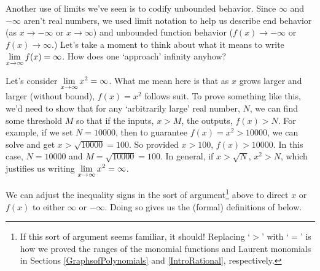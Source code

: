 \documentclass{ximera}
\begin{document}
Another use of limits we've seen is to codify unbounded behavior.  Since $\infty$ and $-\infty$ aren't real numbers,  we used limit notation to help us describe end behavior  (as $x \rightarrow - \infty$ or $x \rightarrow \infty$) and unbounded function behavior ($f(x)\rightarrow -\infty$ or $f(x) \rightarrow \infty$.)  Let's take a moment to think about what it means to write $\ds{\lim_{x \rightarrow \infty} f(x) = \infty}$.  How does one `approach' infinity anyhow?  

\medskip

Let's consider  $\ds{\lim_{x \rightarrow \infty} x^2 = \infty}$.  What me mean here is that as $x$ grows larger and larger (without bound), $f(x) = x^2$ follows suit.  To prove something like this, we'd need to show that for any `arbitrarily large' real number, $N$, we can find some threshold $M$ so that if the inputs, $x>M$, the outputs, $f(x) > N$.  For example, if we set $N = 10000$, then to guarantee $f(x) = x^2 > 10000$, we can solve and get $x > \sqrt{10000} = 100$.  So provided $x > 100$, $f(x) > 10000$.  In this case, $N = 10000$ and $M = \sqrt{10000} = 100$.  In general, if $x > \sqrt{N}$, $x^2 > N$, which justifies us writing $\ds{\lim_{x \rightarrow \infty} x^2 = \infty}$.

\medskip

We can adjust the inequality signs in the sort of argument\footnote{If this sort of argument seems familiar, it should!  Replacing `$>$' with `$=$' is how we proved the ranges  of the monomial functions and Laurent monomials  in Sections \ref{GraphsofPolynomials} and \ref{IntroRational}, respectively.}   above to direct $x$ or $f(x)$ to either $\infty$ or $-\infty$.  Doing so gives us the (formal) definitions of below.

\medskip


\end{document}
